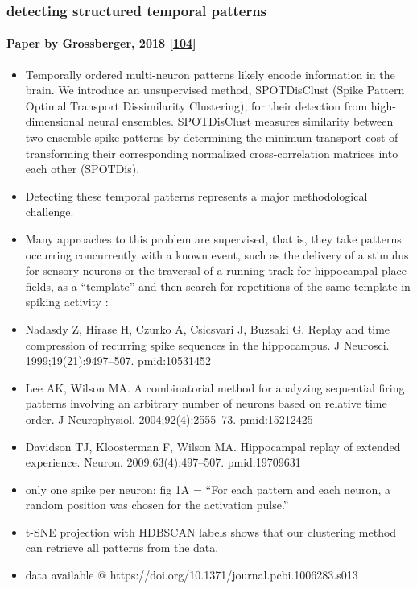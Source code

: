\hypertarget{detecting-structured-temporal-patterns}{%
\subsubsection{detecting structured temporal patterns}\label{detecting-structured-temporal-patterns}}

\hypertarget{paper-by-grossberger-2018-grossberger2018}{%
\paragraph{\texorpdfstring{Paper by Grossberger, 2018 {[}\protect\hyperlink{ref-9AK1cwY1}{104}{]}}{Paper by Grossberger, 2018 {[}104{]}}}\label{paper-by-grossberger-2018-grossberger2018}}

\begin{itemize}
\tightlist
\item
  Temporally ordered multi-neuron patterns likely encode information in the brain. We introduce an unsupervised method, SPOTDisClust (Spike Pattern Optimal Transport Dissimilarity Clustering), for their detection from high-dimensional neural ensembles. SPOTDisClust measures similarity between two ensemble spike patterns by determining the minimum transport cost of transforming their corresponding normalized cross-correlation matrices into each other (SPOTDis).
\item
  Detecting these temporal patterns represents a major methodological challenge.
\item
  Many approaches to this problem are supervised, that is, they take patterns occurring concurrently with a known event, such as the delivery of a stimulus for sensory neurons or the traversal of a running track for hippocampal place fields, as a ``template'' and then search for repetitions of the same template in spiking activity :
\item
  Nadasdy Z, Hirase H, Czurko A, Csicsvari J, Buzsaki G. Replay and time compression of recurring spike sequences in the hippocampus. J Neurosci. 1999;19(21):9497--507. pmid:10531452
\item
  Lee AK, Wilson MA. A combinatorial method for analyzing sequential firing patterns involving an arbitrary number of neurons based on relative time order. J Neurophysiol. 2004;92(4):2555--73. pmid:15212425
\item
  Davidson TJ, Kloosterman F, Wilson MA. Hippocampal replay of extended experience. Neuron. 2009;63(4):497--507. pmid:19709631
\item
  only one spike per neuron: fig 1A = ``For each pattern and each neuron, a random position was chosen for the activation pulse.''
\item
  t-SNE projection with HDBSCAN labels shows that our clustering method can retrieve all patterns from the data.
\item
  data available @ https://doi.org/10.1371/journal.pcbi.1006283.s013
\end{itemize}


